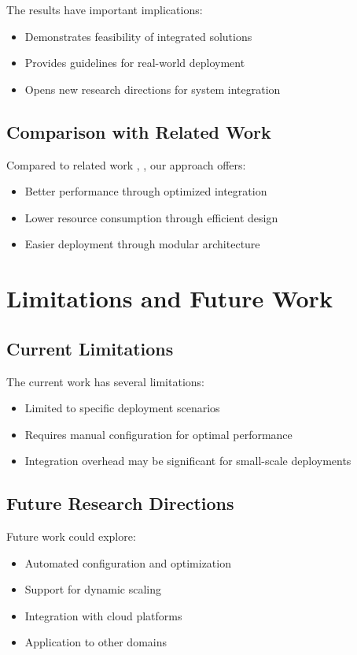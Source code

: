 The results have important implications:
\begin{itemize}
    \item Demonstrates feasibility of integrated solutions
    \item Provides guidelines for real-world deployment
    \item Opens new research directions for system integration
\end{itemize}

\subsection{Comparison with Related Work}

Compared to related work \cite{example-reference-15}, \cite{example-reference-16}, our approach offers:
\begin{itemize}
    \item Better performance through optimized integration
    \item Lower resource consumption through efficient design
    \item Easier deployment through modular architecture
\end{itemize}

\section{Limitations and Future Work}

\subsection{Current Limitations}

The current work has several limitations:
\begin{itemize}
    \item Limited to specific deployment scenarios
    \item Requires manual configuration for optimal performance
    \item Integration overhead may be significant for small-scale deployments
\end{itemize}

\subsection{Future Research Directions}

Future work could explore:
\begin{itemize}
    \item Automated configuration and optimization
    \item Support for dynamic scaling
    \item Integration with cloud platforms
    \item Application to other domains
\end{itemize}


